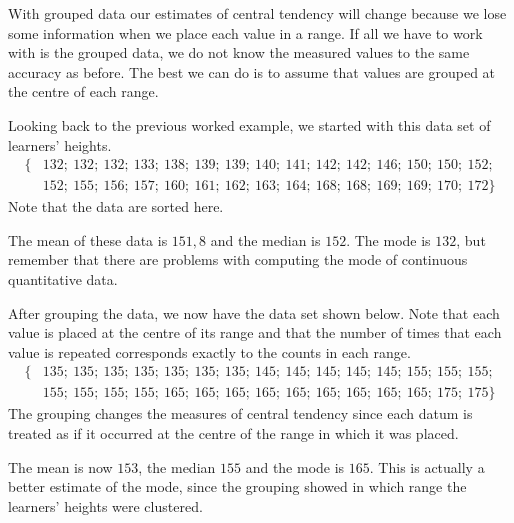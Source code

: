 With grouped data our estimates of central tendency will change
because we lose some information when we place each value in a range.
If all we have to work with is the grouped data, we do not know the
measured values to the same accuracy as before. The best we can do is
to assume that values are grouped at the centre of each range.

\begin{example}
Looking back to the previous worked example, we started with this data
set of learners' heights.
\begin{align*}
  \{&132;\ 132;\ 132;\ 133;\ 138;\ 139;\ 139;\ 140;\ 141;\ 142;\ 142;\ 146;\ 150;\ 150;\ 152;\\
    &152;\ 155;\ 156;\ 157;\ 160;\ 161;\ 162;\ 163;\ 164;\ 168;\ 168;\ 169;\ 169;\ 170;\ 172\}
\end{align*}
Note that the data are sorted here.

The mean of these data is $151,8$ and the median is $152$. The mode is
$132$, but remember that there are problems with computing the mode of
continuous quantitative data.

After grouping the data, we now have the data set shown below. Note
that each value is placed at the centre of its range and that the
number of times that each value is repeated corresponds exactly to the
counts in each range.
\begin{align*}
  \{&135;\ 135;\ 135;\ 135;\ 135;\ 135;\ 135;\ 145;\ 145;\ 145;\ 145;\ 145;\ 155;\ 155;\ 155;\\
    &155;\ 155;\ 155;\ 155;\ 165;\ 165;\ 165;\ 165;\ 165;\ 165;\ 165;\ 165;\ 165;\ 175;\ 175\}
\end{align*}
The grouping changes the measures of central tendency since each datum
is treated as if it occurred at the centre of the range in which it was
placed.

The mean is now $153$, the median $155$ and the mode is $165$. This is
actually a better estimate of the mode, since the grouping showed in
which range the learners' heights were clustered.

\end{example}

